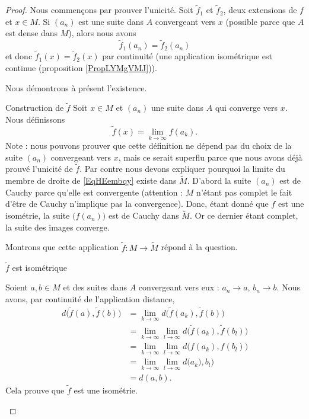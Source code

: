 \begin{proof}
    Nous commençons par prouver l'unicité. Soit \( \tilde f_1\) et \( \tilde f_2\), deux extensions de \( f\) et \( x\in M\). Si \( (a_n)\) est une suite dans \( A\) convergeant vers \( x\) (possible parce que \( A\) est dense dans \( M\)), alors nous avons
    \begin{equation}
        \tilde f_1(a_n)=\tilde f_2(a_n)
    \end{equation}
    et donc \( \tilde f_1(x)=\tilde f_2(x)\) par continuité (une application isométrique est continue (proposition \ref{PropLYMgVMJ})).

    Nous démontrons à présent l'existence.
    
    \begin{subproof}
    \item[Construction de \( \tilde f\)]
    Soit \( x\in M\) et \( (a_n)\) une suite dans \( A\) qui converge vers \( x\). Nous définissons
    \begin{equation}    \label{EqHEembqy}
        \tilde f(x)=\lim_{k\to \infty} f(a_k).
    \end{equation}
    Note : nous pouvons prouver que cette définition ne dépend pas du choix de la suite \( (a_n)\) convergeant vers \( x\), mais ce serait superflu parce que nous avons déjà prouvé l'unicité de \( \tilde f\). Par contre nous devons expliquer pourquoi la limite du membre de droite de \eqref{EqHEembqy} existe dans \( \tilde M\). D'abord la suite \( (a_n)\) est de Cauchy parce qu'elle est convergente (attention : \( M\) n'étant pas complet le fait d'être de Cauchy n'implique pas la convergence). Donc, étant donné que \( f\) est une isométrie, la suite \( \big( f(a_n) \big)\) est de Cauchy dans \( \tilde M\). Or ce dernier étant complet, la suite des images converge.
    
    Montrons que cette application \( \tilde f\colon M\to \tilde M\) répond à la question.

\item[\( \tilde f\) est isométrique]

        Soient \( a,b\in M\) et des suites dans \( A\) convergeant vers eux : \( a_n\to a\), \( b_n\to b\). Nous avons, par continuité de l'application distance,
        \begin{subequations}
            \begin{align}
                d\big( \tilde f(a),\tilde f(b) \big)&=\lim_{k\to \infty} d\big( \tilde f(a_k),\tilde f(b) \big)\\
                &=\lim_{k\to \infty}\lim_{l\to \infty}  d\big( \tilde f(a_k),\tilde f(b_l) \big)\\
                &=\lim_{k\to \infty}\lim_{l\to \infty}  d\big(  f(a_k), f(b_l) \big)\\
                &=\lim_{k\to \infty}\lim_{l\to \infty}  d\big( a_k),b_l\big)\\
                &=d(a,b).
            \end{align}
        \end{subequations}
        Cela prouve que \( \tilde f\) est une isométrie.
        

\end{subproof}
\end{proof}
